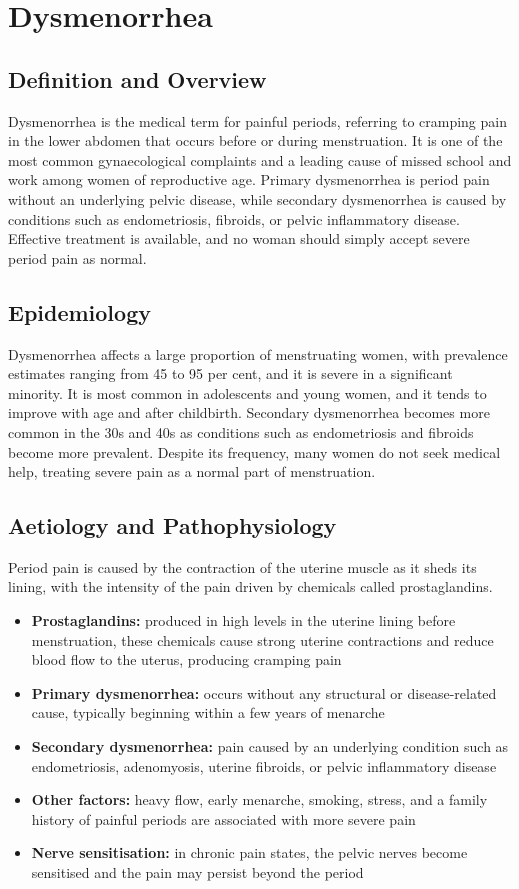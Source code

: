 \chapter{Dysmenorrhea}

\section*{Definition and Overview}
Dysmenorrhea is the medical term for painful periods, referring to cramping pain in the lower abdomen that occurs before or during menstruation. It is one of the most common gynaecological complaints and a leading cause of missed school and work among women of reproductive age. Primary dysmenorrhea is period pain without an underlying pelvic disease, while secondary dysmenorrhea is caused by conditions such as endometriosis, fibroids, or pelvic inflammatory disease. Effective treatment is available, and no woman should simply accept severe period pain as normal.

\section*{Epidemiology}
Dysmenorrhea affects a large proportion of menstruating women, with prevalence estimates ranging from 45 to 95 per cent, and it is severe in a significant minority. It is most common in adolescents and young women, and it tends to improve with age and after childbirth. Secondary dysmenorrhea becomes more common in the 30s and 40s as conditions such as endometriosis and fibroids become more prevalent. Despite its frequency, many women do not seek medical help, treating severe pain as a normal part of menstruation.

\section*{Aetiology and Pathophysiology}
Period pain is caused by the contraction of the uterine muscle as it sheds its lining, with the intensity of the pain driven by chemicals called prostaglandins.
\begin{itemize}
    \item \textbf{Prostaglandins:} produced in high levels in the uterine lining before menstruation, these chemicals cause strong uterine contractions and reduce blood flow to the uterus, producing cramping pain
    \item \textbf{Primary dysmenorrhea:} occurs without any structural or disease-related cause, typically beginning within a few years of menarche
    \item \textbf{Secondary dysmenorrhea:} pain caused by an underlying condition such as endometriosis, adenomyosis, uterine fibroids, or pelvic inflammatory disease
    \item \textbf{Other factors:} heavy flow, early menarche, smoking, stress, and a family history of painful periods are associated with more severe pain
    \item \textbf{Nerve sensitisation:} in chronic pain states, the pelvic nerves become sensitised and the pain may persist beyond the period
\end{itemize}

